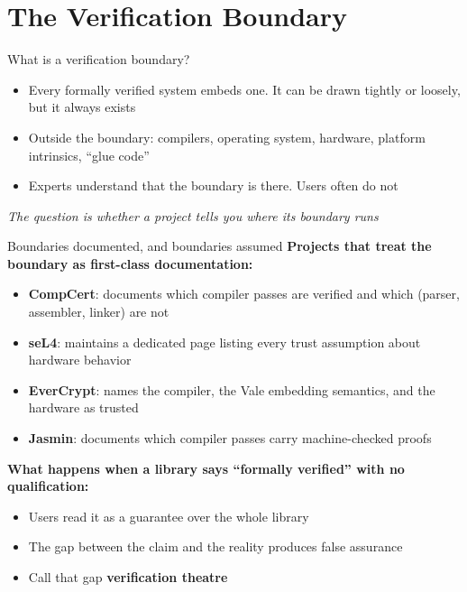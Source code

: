\ifdefined\PRESENTATION\else\PassOptionsToClass{handout}{beamer}\fi\documentclass[aspectratio=169, lualatex]{beamer}
\begin{document}
\section{The Verification Boundary}

\begin{frame}{What is a verification boundary?}
	\vspace{0.5em}
	\begin{itemize}
		\item Every formally verified system embeds one. It can be drawn tightly or loosely, but it always exists
		\item Outside the boundary: compilers, operating system, hardware, platform intrinsics, ``glue code''
		\item Experts understand that the boundary is there. Users often do not
	\end{itemize}
	\vspace{0.5em}
	\begin{center}
		\textit{The question is whether a project tells you where its boundary runs}
	\end{center}
\end{frame}

\begin{frame}{Boundaries documented, and boundaries assumed}
	\textbf{Projects that treat the boundary as first-class documentation:}
	\begin{itemize}
		\item \textbf{CompCert}: documents which compiler passes are verified and which (parser, assembler, linker) are not
		\item \textbf{seL4}: maintains a dedicated page listing every trust assumption about hardware behavior
		\item \textbf{EverCrypt}: names the compiler, the Vale embedding semantics, and the hardware as trusted
		\item \textbf{Jasmin}: documents which compiler passes carry machine-checked proofs
	\end{itemize}
	\vspace{0.5em}
	\textbf{What happens when a library says ``formally verified'' with no qualification:}
	\begin{itemize}
		\item Users read it as a guarantee over the whole library
		\item The gap between the claim and the reality produces false assurance
		\item Call that gap \textbf{verification theatre}
	\end{itemize}
\end{frame}
\end{document}
